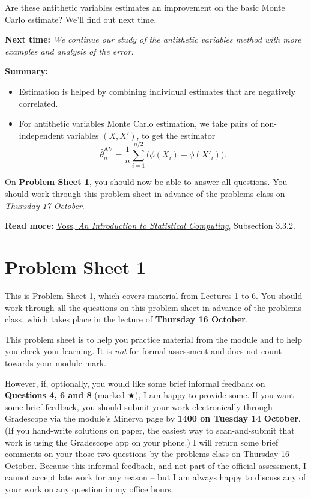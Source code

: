 \documentclass[
  letterpaper,
  DIV=11,
  numbers=noendperiod]{scrreprt}
\theoremstyle{plain}
\theoremstyle{definition}
\theoremstyle{definition}
\theoremstyle{remark}
\begin{document}
Are these antithetic variables estimates an improvement on the basic
Monte Carlo estimate? We'll find out next time.

\textbf{Next time:} \emph{We continue our study of the antithetic
variables method with more examples and analysis of the error.}

\textbf{Summary:}

\begin{itemize}
\item
  Estimation is helped by combining individual estimates that are
  negatively correlated.
\item
  For antithetic variables Monte Carlo estimation, we take pairs of
  non-independent variables \((X, X')\), to get the estimator
  \[ \widehat{\theta}_n^{\mathrm{AV}} = \frac{1}{n} \sum_{i=1}^{n/2} \big(\phi(X_i) + \phi(X'_i) \big) . \]
\end{itemize}

On \hyperref[P1]{\textbf{Problem Sheet 1}}, you should now be able to
answer all questions. You should work through this problem sheet in
advance of the problems class on \emph{Thursday 17 October}.

\textbf{Read more:}
\href{https://leeds.primo.exlibrisgroup.com/permalink/44LEE_INST/1fj430b/cdi_askewsholts_vlebooks_9781118728031}{Voss,
\emph{An Introduction to Statistical Computing}}, Subsection 3.3.2.

\chapter*{Problem Sheet 1}\label{P1}


This is Problem Sheet 1, which covers material from Lectures 1 to 6. You
should work through all the questions on this problem sheet in advance
of the problems class, which takes place in the lecture of
\textbf{Thursday 16 October}.

This problem sheet is to help you practice material from the module and
to help you check your learning. It is \emph{not} for formal assessment
and does not count towards your module mark.

However, if, optionally, you would like some brief informal feedback on
\textbf{Questions 4, 6 and 8} (marked ★), I am happy to provide some. If
you want some brief feedback, you should submit your work electronically
through Gradescope via the module's Minerva page by \textbf{1400 on
Tuesday 14 October}. (If you hand-write solutions on paper, the easiest
way to scan-and-submit that work is using the Gradescope app on your
phone.) I will return some brief comments on your those two questions by
the problems class on Thursday 16 October. Because this informal
feedback, and not part of the official assessment, I cannot accept late
work for any reason -- but I am always happy to discuss any of your work
on any question in my office hours.
\end{document}
